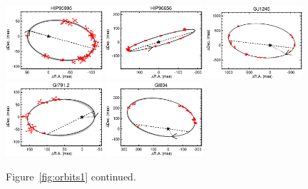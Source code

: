 \documentclass[twocolumn]{aastex62}
\begin{document}
\begin{figure}[htp]
\begin{center}
\includegraphics[width=0.32\textwidth]{Orbits/HIP95995AB.eps}
\includegraphics[width=0.32\textwidth]{Orbits/HIP96656AB.eps}
\includegraphics[width=0.32\textwidth]{Orbits/GJ1245AB.eps}
\includegraphics[width=0.32\textwidth]{Orbits/Gl7912AB.eps}
\includegraphics[width=0.32\textwidth]{Orbits/Gl804AB.eps}
\caption{Figure~\ref{fig:orbits1} continued.}
\label{fig:orbits4}
\end{center}
\end{figure}
\end{document}
